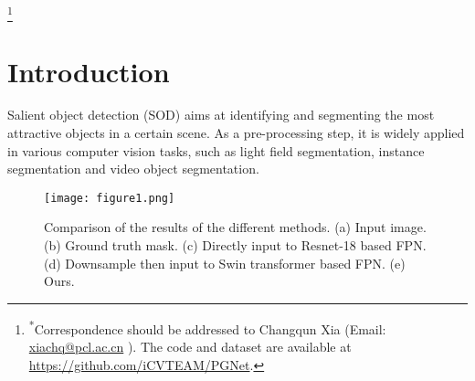 \documentclass[10pt,twocolumn,letterpaper]{article}
\begin{document}
\renewcommand{\thefootnote}{}
\footnote{ \textsuperscript{*}Correspondence should be addressed to Changqun Xia (Email: \href{mailto:xiachq@pcl.ac.cn}{xiachq@pcl.ac.cn} ). The code and dataset are available at \url{https://github.com/iCVTEAM/PGNet}.  }
\section{Introduction}
Salient object detection (SOD) \cite{cheng2014global,borji2019salient} aims at identifying and segmenting the most attractive objects in a certain scene. As a pre-processing step, it is widely applied in various computer vision tasks, such as light field segmentation\cite{liu2021light,zhang2019memory}, instance segmentation \cite{zhou2020multi} and video object segmentation\cite{ji2021full,zhang2021dynamic}.


\begin{figure}[t]
\centering
\texttt{[image: figure1.png]}
\caption{Comparison of the results of the different methods. (a) Input image. (b) Ground truth mask. (c) Directly input to Resnet-18 based FPN. (d) Downsample then input to Swin transformer based FPN. (e) Ours. }
\label{fig:first}
\end{figure}
\end{document}
